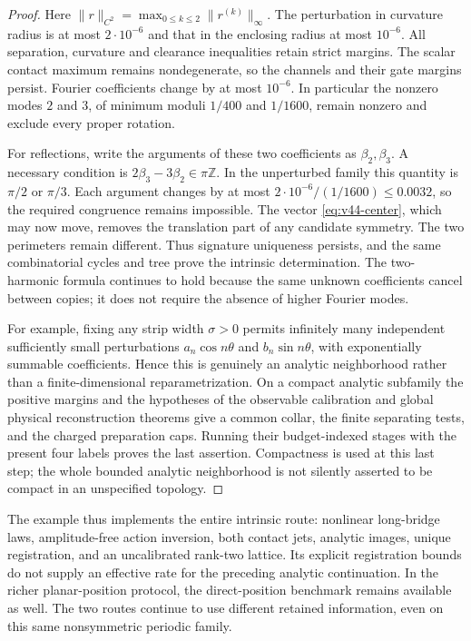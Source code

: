 \begin{proof}
Here $\|r\|_{C^2}=\max_{0\le k\le2}\|r^{(k)}\|_\infty$.
The perturbation in curvature radius is at most $2\cdot10^{-6}$ and
that in the enclosing radius at most $10^{-6}$.  All separation,
curvature and clearance inequalities retain strict margins.  The scalar
contact maximum remains nondegenerate, so the channels and their gate
margins persist.  Fourier coefficients change by at most $10^{-6}$.
In particular the nonzero modes $2$ and $3$, of minimum moduli $1/400$
and $1/1600$, remain nonzero and exclude every proper rotation.

For reflections, write the arguments of these two coefficients as
$\beta_2,\beta_3$.  A necessary condition is
$2\beta_3-3\beta_2\in\pi\mathbb Z$.  In the unperturbed family
this quantity is $\pi/2$ or $\pi/3$.  Each argument changes by at most
$2\cdot10^{-6}/(1/1600)\le0.0032$, so the required congruence remains
impossible.  The vector \eqref{eq:v44-center}, which may now move,
removes the translation part of any candidate symmetry.  The two
perimeters remain different.  Thus signature uniqueness persists, and
the same combinatorial cycles and tree prove the intrinsic determination.
The two-harmonic formula continues to hold because the same unknown
coefficients cancel between copies; it does not require the absence of
higher Fourier modes.

For example, fixing any strip width $\sigma>0$ permits infinitely many
independent sufficiently small perturbations $a_n\cos n\theta$ and
$b_n\sin n\theta$, with exponentially summable coefficients.  Hence this
is genuinely an analytic neighborhood rather than a finite-dimensional
reparametrization.  On a compact analytic subfamily the positive margins
and the hypotheses of the observable calibration and global physical
reconstruction theorems give a common collar, the finite separating tests,
and the charged preparation caps.  Running their budget-indexed stages
with the present four labels proves the last assertion.  Compactness is
used at this last step; the whole bounded analytic neighborhood is not
silently asserted to be compact in an unspecified topology.
\end{proof}

The example thus implements the entire intrinsic route: nonlinear
long-bridge laws, amplitude-free action inversion, both contact jets,
analytic images, unique registration, and an uncalibrated rank-two lattice.
Its explicit registration bounds do not supply an effective rate for the
preceding analytic continuation.  In the richer planar-position protocol,
the direct-position benchmark remains available as well.  The two routes
continue to use different retained information, even on this same
nonsymmetric periodic family.

